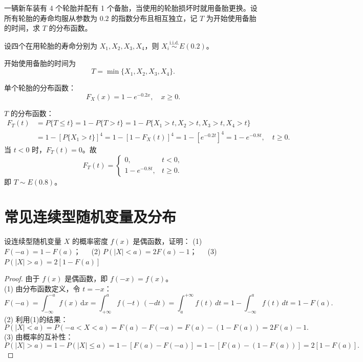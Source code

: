 \documentclass[lang=cn,11pt]{elegantbook}
\begin{document}
\begin{exercise} \label{exer:2-61}
一辆新车装有 4 个轮胎并配有 1 个备胎，当使用的轮胎损坏时就用备胎更换。设所有轮胎的寿命均服从参数为 $0.2$ 的指数分布且相互独立，记 $T$ 为开始使用备胎的时间，求 $T$ 的分布函数。
\end{exercise}

\begin{solution}
设四个在用轮胎的寿命分别为 $X_1,X_2,X_3,X_4$，则 $X_i\stackrel{\text{i.i.d.}}{\sim}E(0.2)$。

开始使用备胎的时间为
\[
T = \min\{X_1,X_2,X_3,X_4\}.
\]

单个轮胎的分布函数：
\[
F_X(x) = 1-e^{-0.2x},\quad x\geqslant0.
\]

$T$ 的分布函数：
\[
\begin{aligned}
F_T(t) &= P\{T\leqslant t\} = 1-P\{T>t\} = 1-P\{X_1>t, X_2>t, X_3>t, X_4>t\} \\
&= 1-\left[P\{X_1>t\}\right]^4 = 1-\left[1-F_X(t)\right]^4 = 1-\left[e^{-0.2t}\right]^4 = 1-e^{-0.8t},\quad t\geqslant0.
\end{aligned}
\]
当 $t<0$ 时，$F_T(t)=0$。故
\[
F_T(t)=
\begin{cases}
0, & t<0, \\[4pt]
1-e^{-0.8t}, & t\geqslant0.
\end{cases}
\]
即 $T\sim E(0.8)$。
\end{solution}



\section{常见连续型随机变量及分布}


\begin{exercise}[偶函数概率密度的性质证明] \label{exer:2-48}
设连续型随机变量 $X$ 的概率密度 $f(x)$ 是偶函数，证明：
(1)$F(-a)=1-F(a)$；~~~(2) $P(|X|<a)=2F(a)-1$；~~~(3)$P(|X|>a)=2[1-F(a)]$
\end{exercise}
\begin{proof}
由于 $f(x)$ 是偶函数，即 $f(-x)=f(x)$。\\
(1) 由分布函数定义，令 $t=-x$：
\[
F(-a) = \int_{-\infty}^{-a} f(x)\,\mathrm{d}x = \int_{+\infty}^{a} f(-t)\,(-dt) = \int_{a}^{+\infty} f(t)\,dt = 1 - \int_{-\infty}^{a} f(t)\,dt = 1 - F(a).
\]
(2) 利用(1)的结果：
\[
P(|X|<a) = P(-a<X<a) = F(a) - F(-a) = F(a) - (1-F(a)) = 2F(a) - 1.
\]
(3) 由概率的互补性：
\[
P(|X|>a) = 1 - P(|X|\leqslant a) = 1 - [F(a) - F(-a)] = 1 - [F(a) - (1-F(a))] = 2[1-F(a)].
\]
\end{proof}
\end{document}
